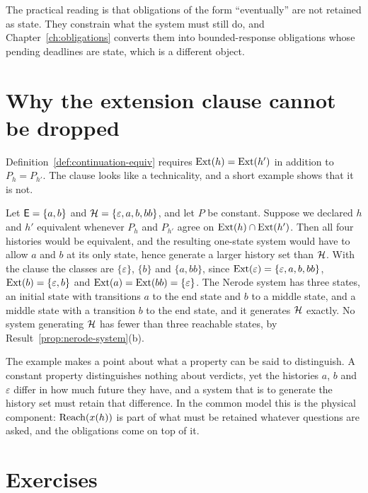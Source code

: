 The practical reading is that obligations of the form ``eventually'' are not retained as state. They constrain what the system must still do, and Chapter~\ref{ch:obligations} converts them into bounded-response obligations whose pending deadlines are state, which is a different object.

\section{Why the extension clause cannot be dropped}\label{sec:ext-clause}

Definition~\ref{def:continuation-equiv} requires $\operatorname{Ext}(h)=\operatorname{Ext}(h')$ in addition to $P_h=P_{h'}$. The clause looks like a technicality, and a short example shows that it is not.

\begin{example}\label{ex:ext-needed}
Let $\mathsf{E}=\{a,b\}$ and $\mathcal{H}=\{\varepsilon,a,b,bb\}$, and let $P$ be constant. Suppose we declared $h$ and $h'$ equivalent whenever $P_h$ and $P_{h'}$ agree on $\operatorname{Ext}(h)\cap\operatorname{Ext}(h')$. Then all four histories would be equivalent, and the resulting one-state system would have to allow $a$ and $b$ at its only state, hence generate a larger history set than $\mathcal{H}$. With the clause the classes are $\{\varepsilon\}$, $\{b\}$ and $\{a,bb\}$, since $\operatorname{Ext}(\varepsilon)=\{\varepsilon,a,b,bb\}$, $\operatorname{Ext}(b)=\{\varepsilon,b\}$ and $\operatorname{Ext}(a)=\operatorname{Ext}(bb)=\{\varepsilon\}$. The Nerode system has three states, an initial state with transitions $a$ to the end state and $b$ to a middle state, and a middle state with a transition $b$ to the end state, and it generates $\mathcal{H}$ exactly. No system generating $\mathcal{H}$ has fewer than three reachable states, by Result~\ref{prop:nerode-system}(b).
\end{example}

The example makes a point about what a property can be said to distinguish. A constant property distinguishes nothing about verdicts, yet the histories $a$, $b$ and $\varepsilon$ differ in how much future they have, and a system that is to generate the history set must retain that difference. In the common model this is the physical component: $\operatorname{Reach}(x(h))$ is part of what must be retained whatever questions are asked, and the obligations come on top of it.

\section*{Exercises}


